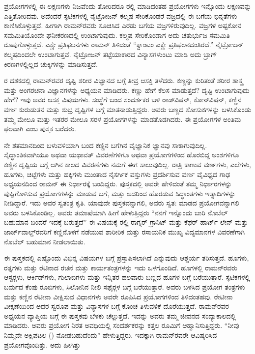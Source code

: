 ಪ್ರಯೋಗಗಳಲ್ಲಿ ಈ ಲಕ್ಷಣಗಳು ನಿಜವೆಂದು ತೋರಿದರೂ ರಲ್ಲಿ ಮಾಡಿದಂತಹ ಪ್ರಯೋಗಗಳು ಇನ್ನೊಂದು ಲಕ್ಷಣವನ್ನು ಎತ್ತಿತೋರಿದವು. ಅದೆಂದರೆ ಸ್ಫಟಿಕಗಳಲ್ಲಿ ನೈಟ್ರೋಜನ್ ಕಲ್ಮಷ ಸೇರಿಕೊಂಡರೆ ವಜ್ರದಲ್ಲಿ ಈ ಬಗೆಯ ಭಿನ್ನತೆಗಳು ಕಾಣಿಸಿಕೊಳ್ಳುತ್ತದೆ. ಹೀಗಾಗಿ ರಾಮನ್‍ರವರು ಸೂಚಿಸಿದ ಎರಡು ಬಗೆಯ ವಜ್ರಗಳಿರುವುದಿಲ್ಲ. ವಜ್ರಗಳ ಅಷ್ಟಕೋನ ಸಮಮಿತಿಯೊಂದೇ ಘನೀಕರಣದಲ್ಲಿ ಉಂಟಾಗುವುದು. ಕಲ್ಮಷ ಸೇರಿಕೊಂಡಾಗ ಅದು ಚತುರ್ಭುಜ ಸಮಮಿತಿ ರೂಪುಗೊಳ್ಳುತ್ತದೆ. ಎಕ್ಸ್\enginline{-}ರೇ ಪ್ರತಿಫಲನಗಳು ರಾಮನ್ ತಿಳಿದಂತೆ “ಕ್ವಾಂಟಂ ಎಕ್ಸ್\enginline{-}ರೇ ಪ್ರತಿಫಲನದಂತಿರದೆ.” ನೈಟ್ರೋಜನ್ ಕಲ್ಮಷದಿಂದಲೇ ಉಂಟಾಗುತ್ತವೆ. ನೈಟ್ರೋಜನ್ ತಟ್ಟೆಯಾಕಾರದ ವಿನ್ಯಾಸಗಳುಂಟು ಮಾಡಿ ಅದು ಬ್ರಾಗ್ ಕಿರಣಗಳಲ್ಲಿಲ್ಲದ ಚುಕ್ಕಿಗಳನ್ನು ಮಾಡಿಸುತ್ತದೆ.



ರ ದಶಕದಲ್ಲಿ ರಾಮನ್‍ರವರ ದೃಷ್ಟಿ ಶರೀರ ವಿಜ್ಞಾನದ ಬಗ್ಗೆ ತೀವ್ರ ಆಸಕ್ತಿ ತಳೆದರು. ಕಣ್ಣನ್ನು ಕುರಿತಂತೆ ಶರೀರ ಶಾಸ್ತ್ರ ಮತ್ತು ಅಂಗರಚನಾ ವಿಜ್ಞಾನಗಳನ್ನು ಅಧ್ಯಯನ ಮಾಡಿದರು. ಕಣ್ಣು ಹೇಗೆ ಕೆಲಸ ಮಾಡುತ್ತದೆ? ದೃಷ್ಟಿ ಉಂಟಾಗುವುದು ಹೇಗೆ? ಇವು ಅವರ ಆಸಕ್ತ ವಿಷಯಗಳು. ಸಂಸ್ಥೆಗೆ ಬಂದ ಸಂದರ್ಶಕರ ಬಳಿ ರಾಡ್‍ವಿಷನ್, ಕೋನ್‍ವಿಷನ್, ಕಣ್ಣಿನ ವರ್ಣ ಕುರುಡುತನ ಮತ್ತು ಶುಭ್ರ ದೃಷ್ಟಿಗಳ ಬಗ್ಗೆ ಮಾತನಾಡುತ್ತಿದ್ದರು. ಅವರು ಬಣ್ಣದ ಸೋಸುಕಗಳನ್ನು ಬಳಸಿಕೊಂಡು ತಮ್ಮ ಮೇಲೂ ಮತ್ತು ಇತರರ ಮೇಲೂ ಸರಳ ಪ್ರಯೋಗಗಳನ್ನು ಮಾಡತೊಡಗಿದರು. ಈ ಪ್ರಯೋಗಗಳ ಅಂತಿಮ ಫಲವಾಗಿ \textit{} ಎಂಬ ಪುಸ್ತಕ ಬರೆದರು.

ನೇ ಶತಮಾನದಿಂದ ಬಳುವಳಿಯಾಗಿ ಬಂದ ಕಣ್ಣಿನ ಬಗೆಗಿನ ವೈಜ್ಞಾನಿಕ ಜ್ಞಾನವು ಸಾಕಾಗುವುದಿಲ್ಲ. ಸೈದ್ಧಾಂತಿಕವಾಗಿಯೂ ಅಥವಾ ಯಥಾವತ್ ವಿವರಣೆಗಳಿಗೂ ಅಥವಾ ಪ್ರಯೋಗಗಳಿಂದ ಹೊರಬಿದ್ದ ಅಂಶಗಳಿಗೂ ಕಣ್ಣಿನ ದೃಷ್ಟಿಯ ಬಗ್ಗೆ ಆಗಿನ ಕಾಲದ ವಿವರಣೆಗಳು ನಮಗೆ ಈಗ ಸಾಲುವುದಿಲ್ಲ. ರಾತ್ರಿ ಕಾಣುವ ವರ್ಣಗಳು, ಎಲೆಗಳು, ಹೂಗಳು, ಚಿಟ್ಟೆಗಳು ಮತ್ತು ಹಕ್ಕಿಗಳು ಮುಂತಾದ ನೈಸರ್ಗಿಕ ವಸ್ತುಗಳು ಪ್ರದರ್ಶಿಸುವ ವರ್ಣ ವೈವಿಧ್ಯದ ಗಾಢ ಅಧ್ಯಯನದಿಂದ ರಾಮನ್ ಈ ನಿರ್ಧಾರಕ್ಕೆ ಬಂದಿದ್ದರು. ಪುಸ್ತಕದಲ್ಲಿ ಅವರೇ ಹೇಳಿದಂತೆ ತಮ್ಮ ನಿರ್ಧಾರಗಳನ್ನು ಪುಷ್ಟಿಗೊಳಿಸುವ ಪ್ರಯೋಗಗಳನ್ನು ಮಾಡುವ ಬಗೆ, ಮತ್ತು ಅದರಿಂದ ಹೊರಡುವ ಸಿದ್ಧಾಂತಗಳು ಇತ್ಯಾದಿಗಳನ್ನು ನೀಡಿದ್ದಾರೆ. ಇದು ಅವರ ಸ್ವತಂತ್ರ ಕೃತಿ. ಯಾವುದೇ ಪುಸ್ತಕವನ್ನಾಗಲಿ, ಅವರು ಸ್ವತ: ಮಾಡದ ಪ್ರಯೋಗವನ್ನಾಗಲಿ ಅವರು ಬಳಸಿಕೊಂಡಿಲ್ಲ. ಅವರು ತಮಾಷೆಯಾಗಿ ಹೀಗೆ ಹೇಳುತ್ತಿದ್ದರು \enginline{-} “ನನಗೆ ಇನ್ನೊಂದು ಬಾರಿ ನೊಬೆಲ್ ಬಹುಮಾನ ಬಂದರೆ ಇದಕ್ಕೆ ಬರುತ್ತದೆ” ಈ ವಿಷಯಕ್ಕೆ ರಲ್ಲಿ ರಾಗ್ನರ್ ಗ್ರಾನಿಟ್ ಮತ್ತು ಕೆಫರ್ ಹಾರ್ಟ್ ಲೇನ್ ಮತ್ತು ಜಾರ್ಜ್‌ವಾಲ್ಡ್‌ರವರಿಗೆ ಕಣ್ಣಿನೊಳಗೆ ನಡೆಯುವ ಶಾರೀರಿಕ ಮತ್ತು ರಸಾಯನಿಕ ಮುಖ್ಯ ವಿದ್ಯಮಾನಗಳ ವಿವರಣೆಗಾಗಿ ನೊಬೆಲ್ ಬಹುಮಾನ ನೀಡಲಾಯಿತು.

ಈ ಪುಸ್ತಕದಲ್ಲಿ ಎಷ್ಟೊಂದು ವಿಭಿನ್ನ ವಿಷಯಗಳ ಬಗ್ಗೆ ಪ್ರಸ್ತಾಪಿಸಲಾಗಿದೆ ಎನ್ನುವುದು ಆಶ್ಚರ್ಯ ತರಿಸುತ್ತದೆ. ಹೂಗಳು, ರತ್ನಗಳು ಮತ್ತು ರೆಟಿನಾದ ರಚನೆ ಮತ್ತು ಕಾರ್ಯತಂತ್ರಗಳನ್ನು ಇದು ಒಳಗೊಂಡಿದೆ. ಹೂಗಳಲ್ಲಿ ರಾಮನ್‍ರವರು ಆಸ್ಟರ್‍ಗಳು, ಆರ್ಕಿಡ್‍ಗಳು, ಗುಲಾಬಿಗಳು ಮತ್ತು ಇನ್ನಿತರ ಹಲವಾರು ಬಣ್ಣದ ಹೂಗಳ ಬಗ್ಗೆ ಬರೆಯುತ್ತಾರೆ. ಸ್ಫಟಿಕಗಳಲ್ಲಿ ಬರ್ಮದ ಕೆಂಪು ರೂಬಿಗಳು, ಸಿಲೋನಿನ ನೀಲಿ ಸಫೈರ್‍ಗಳ ಬಗ್ಗೆ ಬರೆಯುತ್ತಾರೆ. ಅವರು ಬಳಸಿದ ಪ್ರಯೋಗ ತಂತ್ರಗಳು ಮತ್ತು ಕಣ್ಣಿನ ರೆಟೀನಾ ವೀಕ್ಷಿಸುವ ವಿಧಾನಗಳು ಅವರೇ ರೂಪಿಸಿದ ಪ್ರಯೋಗಗಳಿಂದ ತಿಳಿದಂತಹವು. ರೇಟೀನಾ ವೀಕ್ಷಣೆಯಿಂದ ಅದರ ಸ್ವರೂಪ ಮತ್ತು ವಿನ್ಯಾಸಗಳ ಬಗ್ಗೆ ಕೊಂಚ ತಿಳುವಳಿಕೆ ದೊರೆಯುತ್ತದೆ. ರಾಮನ್‍ರವರ ಅಧ್ಯಯನ ವ್ಯಾಪ್ತಿಯ ಬಗ್ಗೆ ಈ ಪುಸ್ತಕವು ಬೆಳಕು ಚೆಲ್ಲುತ್ತದೆ. ಇದನ್ನು ಅವರು ತಮ್ಮ ಜೀವನದ ಸಂದ್ಯಾಕಾಲದಲ್ಲಿ ಮಾಡಿದರು. ಅವರು ಪ್ರಯೋಗ ನಿರತ ಅವಧಿಯಲ್ಲಿ ಸಂದರ್ಶಕರನ್ನು ಕತ್ತಲ ರೂಮಿಗೆ ಆಹ್ವಾನಿಸುತ್ತಿದ್ದರು. “ನೀವು ನಿಮ್ಮದೇ ಅಕ್ಷಿಪಟಲ () ನೋಡಬಹುದೆಂದು” ಹೇಳುತ್ತಿದ್ದರು. ಇದಕ್ಕಾಗಿ ರಾಮನ್‍ರವರೇ ಆವಿಷ್ಕರಿಸಿದ ಪ್ರಯೋಗವೊಂದಿತ್ತು. ಅದು ಹೀಗಿತ್ತು \enginline{-}

